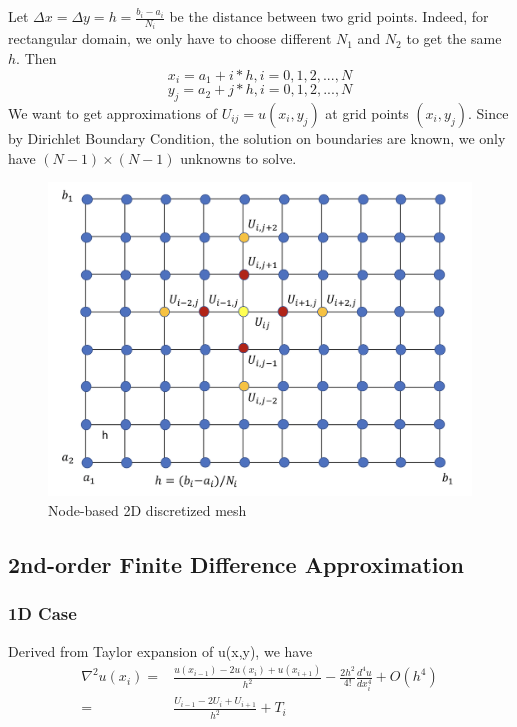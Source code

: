 \documentclass[a4paper]{article}
\begin{document}
Let $\Delta x = \Delta y = h = \frac{b_i-a_i}{N_i}$ be the distance between two grid points. Indeed, for rectangular domain, we only have to choose different $N_1$ and $N_2$ to get the same $h$. Then
$$x_i = a_1 + i*h, i = 0,1,2,...,N$$
$$y_j = a_2 + j*h, i = 0,1,2,...,N$$
We want to get approximations of $U_{ij} = u(x_i,y_j)$ at grid points $(x_i, y_j)$. Since by Dirichlet Boundary Condition, the solution on boundaries are known, we only have $(N-1)\times (N-1)$ unknowns to solve.

\begin{figure}
\includegraphics[width=1\textwidth]{2d.png}
\caption{\label{2d}Node-based 2D discretized mesh}
\end{figure}

\subsection{2nd-order Finite Difference Approximation}
\subsubsection{1D Case}
Derived from Taylor expansion of u(x,y), we have
\begin{equation}
    \begin{split}
    \nabla^2u(x_i) = & \frac{u(x_{i-1}) - 2u(x_i) + u(x_{i+1})}{h^2} -\frac{2h^2}{4!}\frac{d^4 u}{d x_i^4} + O(h^4)\\ 
    = & \frac{U_{i-1} - 2U_{i} + U_{i+1} }{h^2} + T_{i}
    \end{split}
\end{equation}
\end{document}
